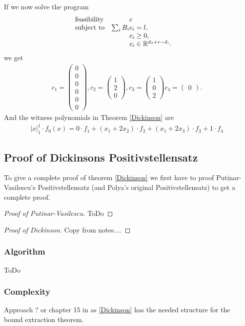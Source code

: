 \documentclass[./main.tex]{subfiles}
\begin{document}
If we now solve the program
\begin{equation*}
\begin{array}{ll@{}ll}
\text{feasibility}  & &c &\\
\text{subject to}& \sum_i B_i &c_i = l,  &\\
& &c_i \geq 0,  &\\
                 &&c_i \in \mathbb{R}^{d_0+r-d_i}.              
\end{array}
\end{equation*}
we get
\begin{align*}
c_1 = \begin{pmatrix}
0\\0\\0\\0\\0\\0
\end{pmatrix},
c_2= \begin{pmatrix}
1 \\ 2 \\ 0
\end{pmatrix},
c_3= \begin{pmatrix}
1 \\ 0 \\ 2
\end{pmatrix}
c_4= \begin{pmatrix}
0
\end{pmatrix}.
\end{align*}
And the witness polynomials in Theorem \ref{Dickinson} are
\begin{align*}
\vert x \vert_1^1 \cdot f_0(x) = 0\cdot f_1 + (x_1+2x_2)\cdot f_2 +(x_1 + 2x_3)\cdot f_3 + 1 \cdot f_4
\end{align*}
\subsection{Proof of Dickinsons Positivstellensatz}
To give a complete proof of  theorem \ref{Dickinson} we first have to proof Putinar-Vasilescu’s Positivstellensatz \cite{putinar1999positive} (and Polya's original Positivstellensatz) to get a complete proof.
\begin{proof}[Proof of Putinar-Vasilescu]
ToDo
\end{proof}


\begin{proof}[Proof of Dickinson]
Copy from notes....
\end{proof}

\subsubsection{Algorithm}
ToDo
\subsubsection{Complexity}
Approach  \cite{delzell1996kreisel}? or chapter 15 in \cite{kohlenbach2008applied} as \ref{Dickinson} has the needed structure for the bound extraction theorem.
\end{document}
